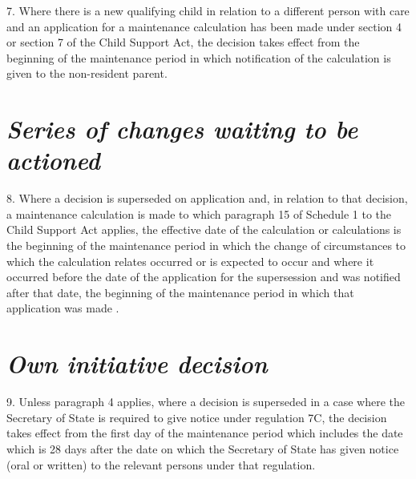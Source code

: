 \documentclass[12pt,a4paper]{article}
\begin{document}
\medskip

7.  Where there is a new qualifying child in relation to a different person with care and an application for a maintenance calculation has been made under section 4 or section 7 of the Child Support Act, the decision takes effect from the beginning of the maintenance period in which notification of the calculation is given to the non-resident parent.

\section*{\itshape\sloppy Series of changes waiting to be actioned}

8.  Where a decision is superseded on application and, in relation to that decision, a maintenance calculation is made to which paragraph 15 of Schedule 1 to the Child Support Act applies, the effective date of the calculation or calculations is the beginning of the maintenance period in which the change of circumstances to which the calculation relates occurred or is expected to occur and where it occurred before the date of the application for the supersession and was notified after that date, 
the beginning of the maintenance period in which that application was made%
.%


\section*{\itshape Own initiative decision}

9.  Unless paragraph 4 applies, where a decision is superseded in a case where the 
Secretary of State  %
is required to give notice under regulation 7C, the decision takes effect from the first day of the maintenance period which includes the date which is 28 days after the date on which the 
Secretary of State  %
has given notice (oral or written) to the relevant persons under that regulation.

\end{document}

